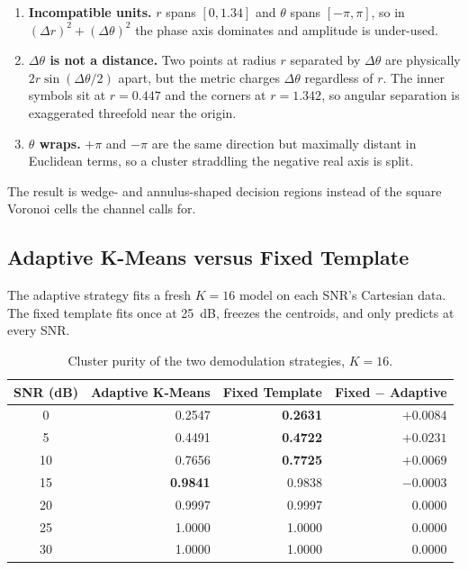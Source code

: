 \documentclass[11pt,a4paper]{article}
\begin{document}
\begin{enumerate}
\item \textbf{Incompatible units.} $r$ spans $[0,1.34]$ and $\theta$ spans $[-\pi,\pi]$, so in
$(\Delta r)^2 + (\Delta\theta)^2$ the phase axis dominates and amplitude is under-used.
\item \textbf{$\Delta\theta$ is not a distance.} Two points at radius $r$ separated by
$\Delta\theta$ are physically $2r\sin(\Delta\theta/2)$ apart, but the metric charges
$\Delta\theta$ regardless of $r$. The inner symbols sit at $r=0.447$ and the corners at
$r=1.342$, so angular separation is exaggerated threefold near the origin.
\item \textbf{$\theta$ wraps.} $+\pi$ and $-\pi$ are the same direction but maximally distant in
Euclidean terms, so a cluster straddling the negative real axis is split.
\end{enumerate}

The result is wedge- and annulus-shaped decision regions instead of the square Voronoi cells the
channel calls for.

\subsection{Adaptive K-Means versus Fixed Template}

The adaptive strategy fits a fresh $K=16$ model on each SNR's Cartesian data. The fixed template
fits once at 25~dB, freezes the centroids, and only predicts at every SNR.

\begin{table}[H]
\centering
\caption{Cluster purity of the two demodulation strategies, $K = 16$.}
\label{tab:q2c}
\begin{tabular}{crrr}
\toprule
SNR (dB) & Adaptive K-Means & Fixed Template & Fixed $-$ Adaptive \\
\midrule
 0 & 0.2547 & \textbf{0.2631} & $+0.0084$ \\
 5 & 0.4491 & \textbf{0.4722} & $\mathbf{+0.0231}$ \\
10 & 0.7656 & \textbf{0.7725} & $+0.0069$ \\
15 & \textbf{0.9841} & 0.9838 & $-0.0003$ \\
20 & 0.9997 & 0.9997 & $0.0000$ \\
25 & 1.0000 & 1.0000 & $0.0000$ \\
30 & 1.0000 & 1.0000 & $0.0000$ \\
\bottomrule
\end{tabular}
\end{table}
\end{document}
